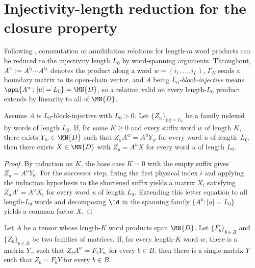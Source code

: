 \section{Injectivity-length reduction for the closure property}\label{sec:block_word_stripping}

Following \cite[Section~IV.C]{Cirac2021Matrix}, commutation or annihilation
relations for length-$m$ word products can be reduced to the injectivity
length $L_0$ by word-spanning arguments.
Throughout, $A^w := A^{i_1}\cdots A^{i_L}$ denotes the product along a word
$w = (i_1,\ldots,i_L)$, $\Gamma_N$ sends a boundary matrix to its open-chain
vector, and $A$ being \emph{$L_0$-block-injective} means
$\spn\{A^u : |u|=L_0\} = \MN{D}$, so a relation valid on every length-$L_0$
product extends by linearity to all of $\MN{D}$.

\begin{lemma}
    \label{thm:block_word_strip_right_factor}
    \leanok
    Assume $A$ is $L_0$-block-injective with $L_0 > 0$. Let
    $\{Z_u\}_{|u|=L_0}$ be a family indexed by words of length $L_0$. If, for
    some $K \ge 0$ and every suffix word $w$ of length $K$, there exists
    $Y_w \in \MN{D}$ such that $Z_u A^w = A^u Y_w$ for every word $u$ of
    length~$L_0$, then there exists $X \in \MN{D}$ with $Z_u = A^u X$ for
    every word $u$ of length $L_0$.
\end{lemma}

\begin{proof}
    \leanok
    By induction on $K$, the base case $K = 0$ with the empty suffix gives
    $Z_u = A^u Y_{\emptyset}$. For the successor step, fixing the first physical
    index $i$ and applying the induction hypothesis to the shortened suffix
    yields a matrix $X_i$ satisfying $Z_u A^i = A^u X_i$ for every word $u$ of
    length $L_0$. Extending this letter equation to all length-$L_0$ words and
    decomposing $\Id$ in the spanning family $\{A^u : |u| = L_0\}$ yields a
    common factor $X$.
\end{proof}

\begin{lemma}
    \label{thm:word_span_common_boundary_matrix}
    \leanok
    Let $A$ be a tensor whose length-$K$ word products span $\MN{D}$. Let
    $\{F_b\}_{b\in B}$ and $\{Z_b\}_{b\in B}$ be two families of matrices. If,
    for every length-$K$ word $w$, there is a matrix $Y_w$ such that
    $Z_b A^w = F_bY_w$ for every $b\in B$, then there is a single matrix $Y$
    such that $Z_b = F_bY$ for every $b\in B$.
\end{lemma}

